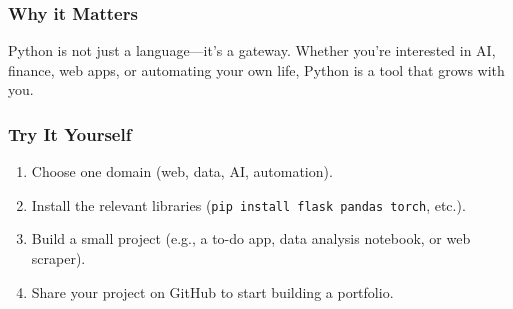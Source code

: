 \documentclass[
  letterpaper,
  DIV=11,
  numbers=noendperiod]{scrreprt}
\providecommand{\tightlist}{%
  \setlength{\itemsep}{0pt}\setlength{\parskip}{0pt}}
\begin{document}
\subsubsection{Why it Matters}\label{why-it-matters-99}

Python is not just a language---it's a gateway. Whether you're
interested in AI, finance, web apps, or automating your own life, Python
is a tool that grows with you.

\subsubsection{Try It Yourself}\label{try-it-yourself-99}

\begin{enumerate}
\def\labelenumi{\arabic{enumi}.}
\tightlist
\item
  Choose one domain (web, data, AI, automation).
\item
  Install the relevant libraries
  (\texttt{pip\ install\ flask\ pandas\ torch}, etc.).
\item
  Build a small project (e.g., a to-do app, data analysis notebook, or
  web scraper).
\item
  Share your project on GitHub to start building a portfolio.
\end{enumerate}
\end{document}
